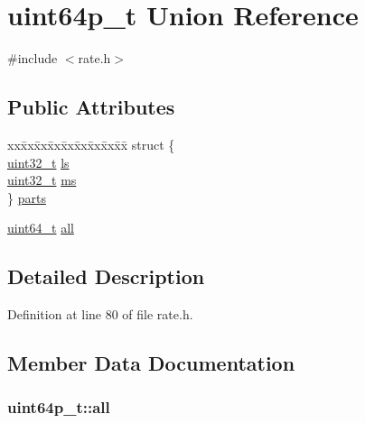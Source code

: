 \hypertarget{unionuint64p__t}{}\section{uint64p\+\_\+t Union Reference}
\label{unionuint64p__t}


{\ttfamily \#include $<$rate.\+h$>$}

\subsection*{Public Attributes}
\begin{DoxyCompactItemize}
\item 
\begin{tabbing}
xx\=xx\=xx\=xx\=xx\=xx\=xx\=xx\=xx\=\kill
struct \{\\
\>\hyperlink{lib-src_2ffmpeg_2win32_2stdint_8h_a6eb1e68cc391dd753bc8ce896dbb8315}{uint32\_t} \hyperlink{unionuint64p__t_a897bb38196ef14af0eeeea93d1f08f7e}{ls}\\
\>\hyperlink{lib-src_2ffmpeg_2win32_2stdint_8h_a6eb1e68cc391dd753bc8ce896dbb8315}{uint32\_t} \hyperlink{unionuint64p__t_a5c67766ff00a31ed0d782d7e1dff807a}{ms}\\
\} \hyperlink{unionuint64p__t_a58b4b4781074ee0c7df95e767338da74}{parts}\\

\end{tabbing}\item 
\hyperlink{lib-src_2ffmpeg_2win32_2stdint_8h_aec6fcb673ff035718c238c8c9d544c47}{uint64\+\_\+t} \hyperlink{unionuint64p__t_a8b04680b8dbcaabfe1fb631e8fc5d860}{all}
\end{DoxyCompactItemize}


\subsection{Detailed Description}


Definition at line 80 of file rate.\+h.



\subsection{Member Data Documentation}
\subsubsection[{\texorpdfstring{all}{all}}]{ uint64p\+\_\+t\+::all}\hypertarget{unionuint64p__t_a8b04680b8dbcaabfe1fb631e8fc5d860}{}\label{unionuint64p__t_a8b04680b8dbcaabfe1fb631e8fc5d860}


